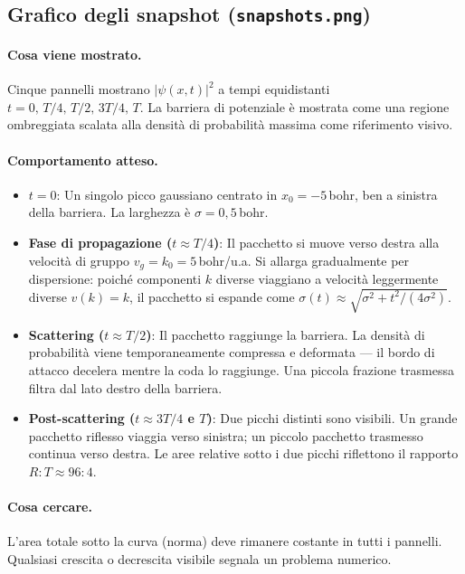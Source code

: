\documentclass[12pt, a4paper]{article}
\begin{document}
\subsection{Grafico degli snapshot (\texttt{snapshots.png})}

\paragraph{Cosa viene mostrato.}
Cinque pannelli mostrano $|\psi(x,t)|^2$ a tempi equidistanti
$t = 0,\, T/4,\, T/2,\, 3T/4,\, T$.
La barriera di potenziale è mostrata come una regione ombreggiata
scalata alla densità di probabilità massima come riferimento visivo.

\paragraph{Comportamento atteso.}
\begin{itemize}
  \item \textbf{$t = 0$}: Un singolo picco gaussiano centrato in
        $x_0 = -5$\,bohr, ben a sinistra della barriera.
        La larghezza è $\sigma = 0{,}5$\,bohr.

  \item \textbf{Fase di propagazione ($t \approx T/4$)}: Il pacchetto
        si muove verso destra alla velocità di gruppo
        $v_g = k_0 = 5$\,bohr/u.a.  Si allarga gradualmente per
        dispersione: poiché componenti $k$ diverse viaggiano a velocità
        leggermente diverse $v(k) = k$, il pacchetto si espande come
        $\sigma(t) \approx \sqrt{\sigma^2 + t^2/(4\sigma^2)}$.

  \item \textbf{Scattering ($t \approx T/2$)}: Il pacchetto raggiunge
        la barriera.  La densità di probabilità viene temporaneamente
        compressa e deformata --- il bordo di attacco decelera mentre
        la coda lo raggiunge.  Una piccola frazione trasmessa filtra
        dal lato destro della barriera.

  \item \textbf{Post-scattering ($t \approx 3T/4$ e $T$)}: Due picchi
        distinti sono visibili.  Un grande pacchetto riflesso viaggia
        verso sinistra; un piccolo pacchetto trasmesso continua verso
        destra.  Le aree relative sotto i due picchi riflettono il
        rapporto $R:T \approx 96:4$.
\end{itemize}

\paragraph{Cosa cercare.}
L'area totale sotto la curva (norma) deve rimanere costante in tutti
i pannelli.  Qualsiasi crescita o decrescita visibile segnala un
problema numerico.
\end{document}
